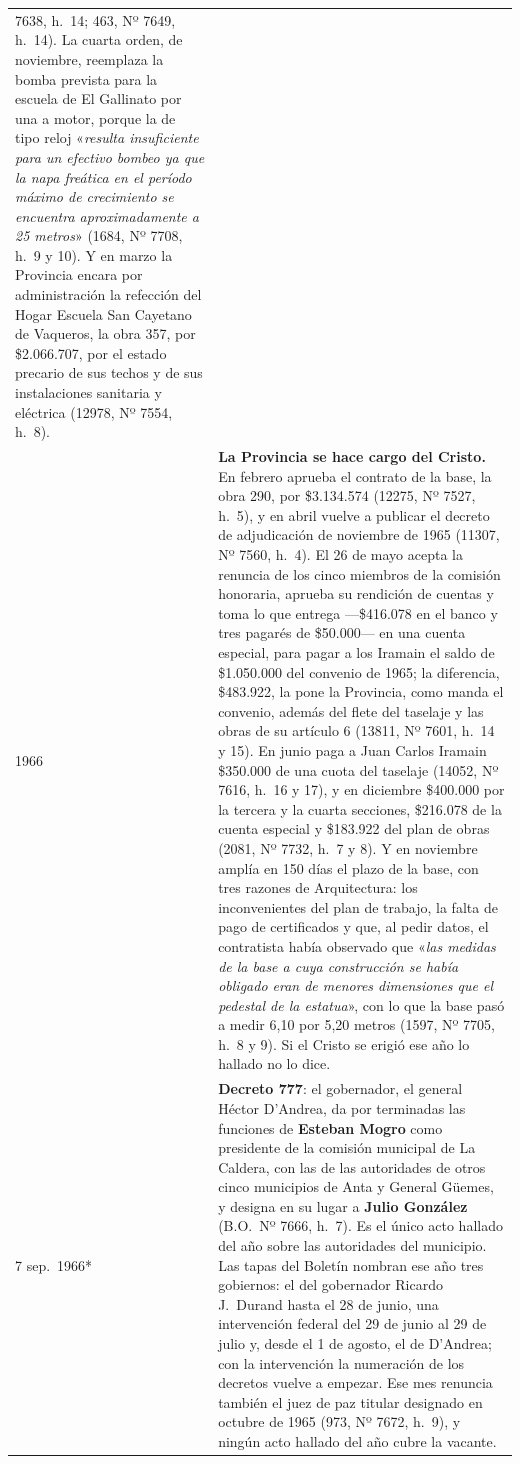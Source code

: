 \begin{longtable}{@{}p{2.7cm}p{10.3cm}@{}}
7638, h.\ 14; 463, Nº 7649, h.\ 14). La cuarta orden, de noviembre, reemplaza la bomba prevista para la escuela de El Gallinato por una a motor, porque la de tipo reloj «\textit{resulta insuficiente para un efectivo bombeo ya que la napa freática en el período máximo de crecimiento se encuentra aproximadamente a 25 metros}» (1684, Nº 7708, h.\ 9 y 10). Y en marzo la Provincia encara por administración la refección del Hogar Escuela San Cayetano de Vaqueros, la obra 357, por \$2.066.707, por el estado precario de sus techos y de sus instalaciones sanitaria y eléctrica (12978, Nº 7554, h.\ 8). \\
1966 & \textbf{La Provincia se hace cargo del Cristo.} En febrero aprueba el contrato de la base, la obra 290, por \$3.134.574 (12275, Nº 7527, h.\ 5), y en abril vuelve a publicar el decreto de adjudicación de noviembre de 1965 (11307, Nº 7560, h.\ 4). El 26 de mayo acepta la renuncia de los cinco miembros de la comisión honoraria, aprueba su rendición de cuentas y toma lo que entrega ---\$416.078 en el banco y tres pagarés de \$50.000--- en una cuenta especial, para pagar a los Iramain el saldo de \$1.050.000 del convenio de 1965; la diferencia, \$483.922, la pone la Provincia, como manda el convenio, además del flete del taselaje y las obras de su artículo 6 (13811, Nº 7601, h.\ 14 y 15). En junio paga a Juan Carlos Iramain \$350.000 de una cuota del taselaje (14052, Nº 7616, h.\ 16 y 17), y en diciembre \$400.000 por la tercera y la cuarta secciones, \$216.078 de la cuenta especial y \$183.922 del plan de obras (2081, Nº 7732, h.\ 7 y 8). Y en noviembre amplía en 150 días el plazo de la base, con tres razones de Arquitectura: los inconvenientes del plan de trabajo, la falta de pago de certificados y que, al pedir datos, el contratista había observado que «\textit{las medidas de la base a cuya construcción se había obligado eran de menores dimensiones que el pedestal de la estatua}», con lo que la base pasó a medir 6,10 por 5,20 metros (1597, Nº 7705, h.\ 8 y 9). Si el Cristo se erigió ese año lo hallado no lo dice. \\
7 sep.\ 1966* & \textbf{Decreto 777}: el gobernador, el general Héctor D'Andrea, da por terminadas las funciones de \textbf{Esteban Mogro}\index{Mogro, Esteban} como presidente de la comisión municipal de La Caldera, con las de las autoridades de otros cinco municipios de Anta y General Güemes, y designa en su lugar a \textbf{Julio González} (B.O.\ Nº 7666, h.\ 7). Es el único acto hallado del año sobre las autoridades del municipio. Las tapas del Boletín nombran ese año tres gobiernos: el del gobernador Ricardo J.\ Durand hasta el 28 de junio, una intervención federal del 29 de junio al 29 de julio y, desde el 1 de agosto, el de D'Andrea; con la intervención la numeración de los decretos vuelve a empezar. Ese mes renuncia también el juez de paz titular designado en octubre de 1965 (973, Nº 7672, h.\ 9), y ningún acto hallado del año cubre la vacante. \\

\end{longtable}
